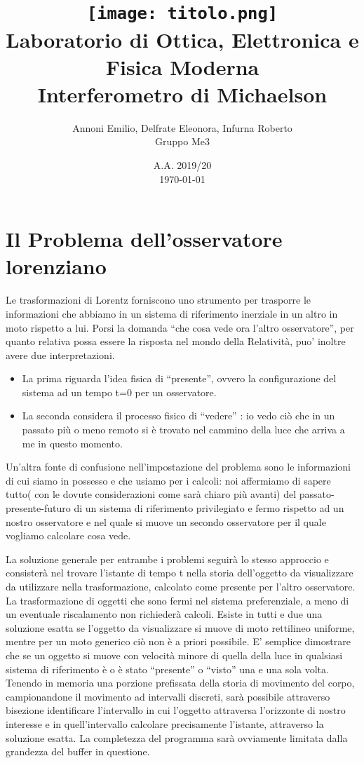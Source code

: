 \documentclass{report}
\title{
  \texttt{[image: titolo.png]} \\[1cm]
  Laboratorio di Ottica, Elettronica e Fisica Moderna \\
  Interferometro di Michaelson \\
}
\author{
  Annoni Emilio, Delfrate Eleonora, Infurna Roberto \\
  Gruppo Me3 \\
}
\date{
  A.A. 2019/20 \\
  \today
  }
\begin{document}
\section{Il Problema dell'osservatore lorenziano}


Le trasformazioni di Lorentz forniscono uno strumento per trasporre le informazioni che abbiamo in un sistema
di riferimento inerziale in un altro in moto rispetto a lui.
Porsi la domanda “che cosa vede ora l’altro osservatore”, per quanto relativa possa essere la risposta nel
mondo della Relatività, puo’ inoltre avere due interpretazioni.

\begin{itemize}
\item{
La prima riguarda l’idea fisica di “presente”, ovvero la configurazione del sistema ad un tempo t=0 per un
osservatore.
}
\item{
La seconda considera il processo fisico di “vedere” : io vedo ciò che in un passato più o meno remoto si è
trovato nel cammino della luce che arriva a me in questo momento.
}
\end{itemize}

Un’altra fonte di confusione nell’impostazione del problema sono le informazioni di cui siamo in possesso e che
usiamo per i calcoli: noi affermiamo di sapere tutto( con le dovute considerazioni come sarà chiaro più avanti)
del passato-presente-futuro di un sistema di riferimento privilegiato e fermo rispetto ad un nostro osservatore e
nel quale si muove un secondo osservatore per il quale vogliamo calcolare cosa vede.

La soluzione generale per entrambe i problemi seguirà lo stesso approccio e consisterà nel trovare l’istante di
tempo t nella storia dell’oggetto da visualizzare da utilizzare nella trasformazione, calcolato come presente per
l’altro osservatore.
La trasformazione di oggetti che sono fermi nel sistema preferenziale, a meno di un eventuale riscalamento non
richiederà calcoli.
Esiste in tutti e due una soluzione esatta se l’oggetto da visualizzare si muove di moto rettilineo uniforme,
mentre per un moto generico ciò non è a priori possibile.
E’ semplice dimostrare che se un oggetto si muove con velocità minore di quella della luce in qualsiasi sistema
di riferimento è o è stato “presente” o “visto” una e una sola volta.
Tenendo in memoria una porzione prefissata della storia di movimento del corpo, campionandone il movimento
ad intervalli discreti, sarà possibile attraverso bisezione identificare l’intervallo in cui l’oggetto attraversa
l’orizzonte di nostro interesse e in quell’intervallo calcolare precisamente l’istante, attraverso la soluzione esatta.
La completezza del programma sarà ovviamente limitata dalla grandezza del buffer in questione.
\end{document}

